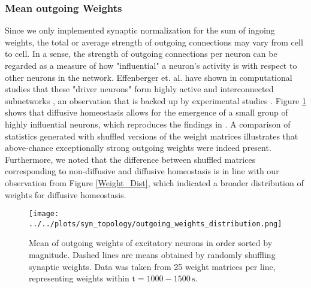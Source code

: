 \documentclass[10pt,a4paper]{article}
\begin{document}
\subsubsection{Mean outgoing Weights}\label{Section_Mean_outgoing_Weights}
Since we only implemented synaptic normalization for the sum of ingoing weights, the total or average strength of outgoing connections may vary from cell to cell. In a sense, the strength of outgoing connections per neuron can be regarded as a measure of how "influential" a neuron's activity is with respect to other neurons in the network. Effenberger et. al. have shown in computational studies that these "driver neurons" form highly active and interconnected subnetworks \cite{Effenberger_2015}, an observation that is backed up by experimental studies \cite{Yassin_Subnetworks_2010,Eckmann_Leader_Neurons_2008}. Figure \ref{Out_Weight_Mean_Quantile} shows that diffusive homeostasis allows for the emergence of a small group of highly influential neurons, which reproduces the findings in \cite{Effenberger_2015}. A comparison of statistics generated with shuffled versions of the weight matrices illustrates that above-chance exceptionally strong outgoing weights were indeed present. Furthermore, we noted that the difference between shuffled matrices corresponding to non-diffusive and diffusive homeostasis is in line with our observation from Figure \ref{Weight_Dist}, which indicated a broader distribution of weights for diffusive homeostasis.
\begin{figure}
\texttt{[image: ../../plots/syn\_topology/outgoing\_weights\_distribution.png]}
\caption{Mean of outgoing weights of excitatory neurons in order sorted by magnitude. Dashed lines are means obtained by randomly shuffling synaptic weights. Data was taken from 25 weight matrices per line, representing weights within $\mathrm{t=1000-1500\,s}$.}
\label{Out_Weight_Mean_Quantile}
\end{figure}
\end{document}
